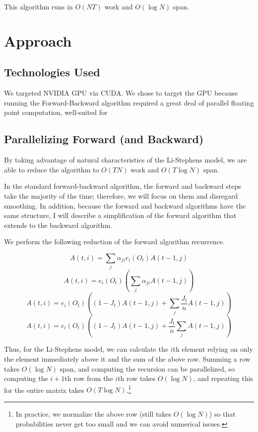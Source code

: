 \documentclass[12pt]{article}
\begin{document}
This algorithm runs in $O(NT)$ work and $O(\log N)$ span.  

\section{Approach}

\subsection{Technologies Used}

We targeted NVIDIA GPU via CUDA.  We chose to target the GPU because running the Forward-Backward algorithm required a great deal of parallel floating point computation, well-suited for %

\subsection{Parallelizing Forward (and Backward)}

By taking advantage of natural characteristics of the Li-Stephens model, we are able to reduce the algorithm to $O(TN)$ work and $O(T\log N)$ span.

In the standard forward-backward algorithm, the forward and backward steps take the majority of the time; therefore, we will focus on them and disregard smoothing.  In addition, because the forward and backward algorithms have the same structure, I will describe a simplification of the forward algorithm that extends to the backward algorithm.

We perform the following reduction of the forward algorithm recurrence.

$$ A(t, i) = \sum_j \alpha_{ji} e_i(O_t) A(t-1, j) $$
$$ A(t, i) = e_i(O_t) (\sum_j \alpha_{ji}  A(t-1, j)) $$
$$ A(t, i) = e_i(O_t) ((1-J_t)A(t-1, j) + \sum_j \frac{J_t}{n} A(t-1, j)) $$
$$ A(t, i) = e_i(O_t) ((1-J_t)A(t-1, j) + \frac{J_t}{n}\sum_j A(t-1, j)) $$

Thus, for the Li-Stephens model, we can calculate the $i$th element relying on only the element immediately above it and the sum of the above row.  Summing a row takes $O(\log N)$ span, and computing the recursion can be parallelized, so computing the $i+1$th row from the $i$th row takes $O(\log N)$, and repeating this for the entire matrix takes $O(T\log N)$.\footnote{In practice, we normalize the above row (still takes $O(\log N)$) so that probabilities never get too small and we can avoid numerical issues.}
\end{document}
